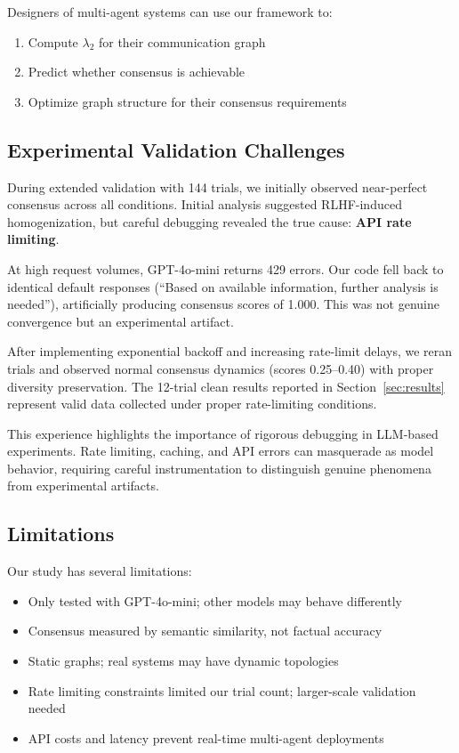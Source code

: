 \documentclass[10pt]{article}
\begin{document}
Designers of multi-agent systems can use our framework to:
\begin{enumerate}
    \item Compute $\lambda_2$ for their communication graph
    \item Predict whether consensus is achievable
    \item Optimize graph structure for their consensus requirements
\end{enumerate}

\subsection{Experimental Validation Challenges}\label{sec:validation}

During extended validation with 144 trials, we initially observed near-perfect consensus across all conditions. Initial analysis suggested RLHF-induced homogenization, but careful debugging revealed the true cause: \textbf{API rate limiting}.

At high request volumes, GPT-4o-mini returns 429 errors. Our code fell back to identical default responses (``Based on available information, further analysis is needed''), artificially producing consensus scores of 1.000. This was not genuine convergence but an experimental artifact.

After implementing exponential backoff and increasing rate-limit delays, we reran trials and observed normal consensus dynamics (scores 0.25--0.40) with proper diversity preservation. The 12-trial clean results reported in Section~\ref{sec:results} represent valid data collected under proper rate-limiting conditions.

This experience highlights the importance of rigorous debugging in LLM-based experiments. Rate limiting, caching, and API errors can masquerade as model behavior, requiring careful instrumentation to distinguish genuine phenomena from experimental artifacts.

\subsection{Limitations}

Our study has several limitations:
\begin{itemize}
    \item Only tested with GPT-4o-mini; other models may behave differently
    \item Consensus measured by semantic similarity, not factual accuracy
    \item Static graphs; real systems may have dynamic topologies
    \item Rate limiting constraints limited our trial count; larger-scale validation needed
    \item API costs and latency prevent real-time multi-agent deployments
\end{itemize}
\end{document}
